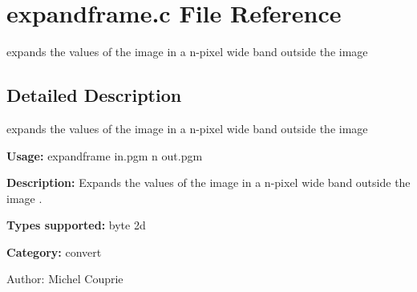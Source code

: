 \section{expandframe.c File Reference}
\label{expandframe_8c}
expands the values of the image in a n-pixel wide band outside the image 



\subsection{Detailed Description}
expands the values of the image in a n-pixel wide band outside the image 

{\bf Usage:} expandframe in.pgm n out.pgm

{\bf Description:} Expands the values of the image in a n-pixel wide band outside the image .

{\bf Types supported:} byte 2d

{\bf Category:} convert

\begin{Desc}
\item[Author:]Michel Couprie \end{Desc}
